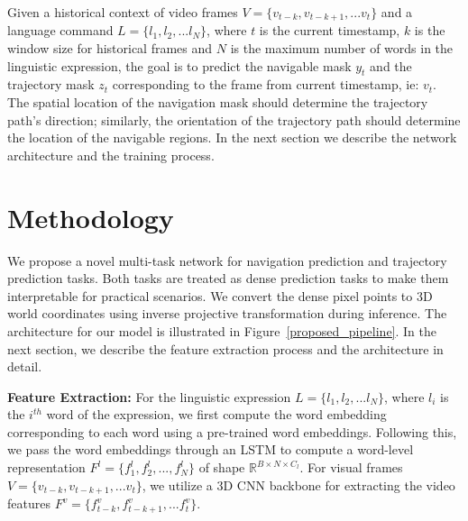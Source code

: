 \documentclass[11pt]{article}
\begin{document}
Given a historical context of video frames $V=\{v_{t-k}, v_{t-k+1}, ... v_{t}\}$ and a language command $L = \{l_1, l_2, ...l_N\}$, where $t$ is the current timestamp, $k$ is the window size for historical frames and $N$ is the maximum number of words in the linguistic expression, the goal is to predict the navigable mask $y_t$ and the trajectory mask $z_t$ corresponding to the frame from current timestamp, ie: $v_t$. The spatial location of the navigation mask should determine the trajectory path's direction; similarly, the orientation of the trajectory path should determine the location of the navigable regions. In the next section we describe the network architecture and the training process.



\section{Methodology}

We propose a novel multi-task network for navigation prediction and trajectory prediction tasks. Both tasks are treated as dense prediction tasks to make them interpretable for practical scenarios. We convert the dense pixel points to 3D world coordinates using inverse projective transformation during inference. The architecture for our model is illustrated in Figure~\ref{proposed_pipeline}. In the next section, we  describe the feature extraction process and the architecture in detail.

\textbf{Feature Extraction: }For the linguistic expression $L = \{l_1, l_2, ...l_N\}$, where $l_i$ is the $i^{th}$ word of the expression, we first compute the word embedding corresponding to each word using a pre-trained word embeddings. Following this, we pass the word embeddings through an LSTM to compute a word-level representation $F^l = \{f^{l}_{1}, f^{l}_{2}, ..., f^{l}_{N}\}$ of shape $\mathbb R^{B \times N \times C_l}$. For visual frames $V=\{v_{t-k}, v_{t-k+1}, ... v_{t}\}$, we utilize a 3D CNN backbone for extracting the video features $F^v=\{f^{v}_{t-k}, f^{v}_{t-k+1}, ... f^{v}_{t}\}$.
\end{document}
